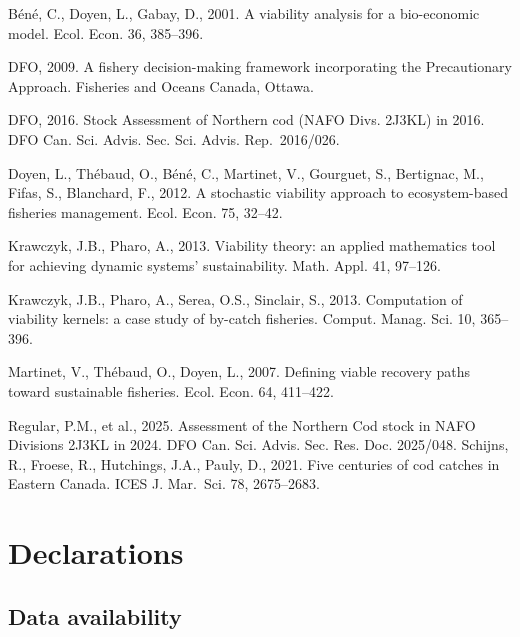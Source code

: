 \documentclass[11pt]{article}
\begin{document}
B\'en\'e, C., Doyen, L., Gabay, D., 2001. A viability analysis for a
bio-economic model. Ecol. Econ. 36, 385--396.

DFO, 2009. A fishery decision-making framework incorporating the
Precautionary Approach. Fisheries and Oceans Canada, Ottawa.

DFO, 2016. Stock Assessment of Northern cod (NAFO Divs. 2J3KL) in 2016.
DFO Can. Sci. Advis. Sec. Sci. Advis. Rep.~2016/026.

Doyen, L., Th\'ebaud, O., B\'en\'e, C., Martinet, V., Gourguet, S., Bertignac,
M., Fifas, S., Blanchard, F., 2012. A stochastic viability approach to
ecosystem-based fisheries management. Ecol. Econ. 75, 32--42.

Krawczyk, J.B., Pharo, A., 2013. Viability theory: an applied
mathematics tool for achieving dynamic systems' sustainability. Math.
Appl. 41, 97--126.

Krawczyk, J.B., Pharo, A., Serea, O.S., Sinclair, S., 2013. Computation
of viability kernels: a case study of by-catch fisheries. Comput. Manag.
Sci. 10, 365--396.

Martinet, V., Th\'ebaud, O., Doyen, L., 2007. Defining viable recovery
paths toward sustainable fisheries. Ecol. Econ. 64, 411--422.

Regular, P.M., et al., 2025. Assessment of the Northern Cod stock in
NAFO Divisions 2J3KL in 2024. DFO Can. Sci. Advis. Sec. Res. Doc.
2025/048. Schijns, R., Froese, R., Hutchings, J.A., Pauly, D., 2021.
Five centuries of cod catches in Eastern Canada. ICES J. Mar.~Sci. 78,
2675--2683.

\section*{Declarations}

\subsection*{Data availability}
\end{document}
